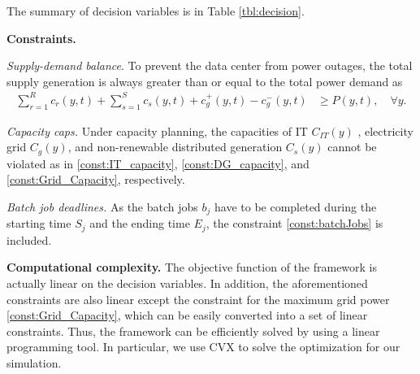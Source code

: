 The summary of decision variables is in Table \ref{tbl:decision}.

\textbf{Constraints.}
 
\textit{Supply-demand balance}. To prevent the data center from power outages, the total supply generation is always greater than or equal to the total power demand as
\begin{align}
    \sum_{r=1}^{R}c_{r}(y,t) + \sum_{s=1}^{S}c_{s}(y,t) 
+ c^+_{g}(y,t) - c^-_{g}(y,t) &\geq P(y,t), \quad \forall y.
\end{align}


\textit{Capacity caps.} Under capacity planning, the capacities of IT $C_{IT}(y)$ , electricity grid $C_g(y)$, and non-renewable distributed generation $C_s(y)$  cannot be violated as in \eqref{const:IT_capacity}, \eqref{const:DG_capacity}, and \eqref{const:Grid_Capacity}, respectively. 

\textit{Batch job deadlines.} As the batch jobs $b_j$ have to be completed during the starting time $S_j$ and the ending time $E_j$, the constraint \eqref{const:batchJobs} is included.

\textbf{Computational complexity.} The objective function of the framework is actually linear on the decision variables. In addition, the aforementioned constraints are also linear except the constraint for the maximum grid power {\eqref{const:Grid_Capacity}}, which can be easily converted into a set of linear constraints. Thus, the framework can be efficiently solved by using a linear programming tool. In particular, we use CVX {\cite{grant2008cvx}} to solve the optimization for our simulation.
